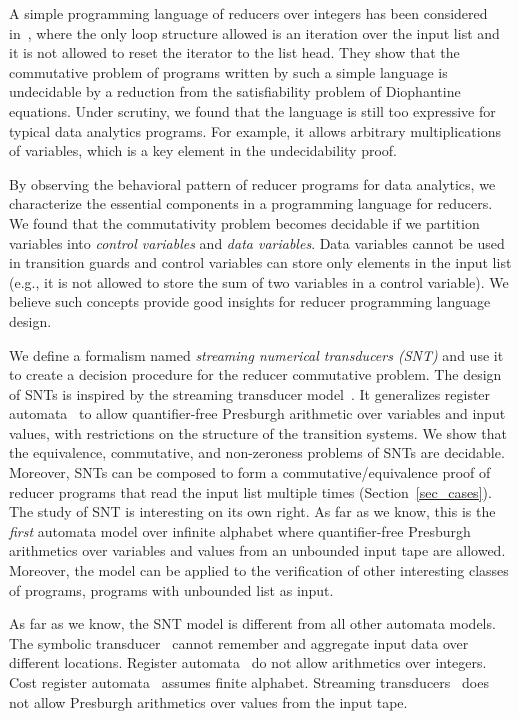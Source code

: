 A simple programming language of reducers over integers has been considered in~\cite{CHSW15}, where the only loop structure allowed is an iteration over the input list and it is not allowed to reset the iterator to the list head. They show that the commutative problem of programs written by such a simple language is undecidable by a reduction from the satisfiability problem of Diophantine equations. Under scrutiny, we found that the language is still too expressive for typical data analytics programs. For example, it allows arbitrary multiplications of variables, which is a key element in the undecidability proof. 

By observing the behavioral pattern of reducer programs for data analytics, we characterize the essential components in a programming language for reducers. %
We found that the commutativity problem becomes decidable if we partition variables into \emph{control variables} and \emph{data variables}. Data variables cannot be used in transition guards and control variables can store only elements in the input list (e.g., it is not allowed to store the sum of two variables in a control variable). 
We believe such concepts provide good insights for reducer programming language design.

We define a formalism named \emph{streaming numerical transducers (SNT)} and use it to create a decision procedure for the reducer commutative problem.
The design of SNTs is inspired by the streaming transducer model~\cite{RP11}.
It generalizes register automata~\cite{KF94,NSV04} to allow quantifier-free Presburgh arithmetic over variables and input values, with restrictions on the structure of the transition systems.
We show that the equivalence, commutative, and non-zeroness problems of SNTs are decidable.
Moreover, SNTs can be composed to form a commutative/equivalence proof of reducer programs that read the input list multiple times (Section~\ref{sec_cases}).
The study of SNT is interesting on its own right. As far as we know, this is the \emph{first} automata model over infinite alphabet where quantifier-free Presburgh arithmetics over variables and values from an unbounded input tape are allowed. Moreover, the model can be applied to the verification of other interesting classes of programs, programs with unbounded list as input.

As far as we know, the SNT model  is different from all other automata models. The symbolic transducer~\cite{VHL+12} cannot remember and aggregate input data over different locations. Register automata~\cite{KF94,NSV04} do not allow arithmetics over integers. Cost register automata~\cite{ADD+13} assumes finite alphabet. Streaming transducers~\cite{RP11} does not allow Presburgh arithmetics over values from the input tape.  

